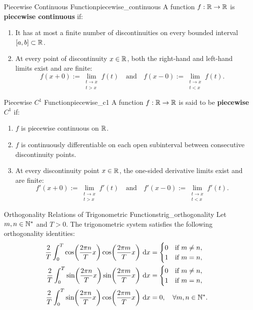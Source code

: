 \begin{definition}{Piecewise Continuous Function}{piecewise_continuous}
A function $f: \mathbb{R} \to \mathbb{R}$ is \textbf{piecewise continuous} if:
\begin{enumerate}
    \item It has at most a finite number of discontinuities on every bounded interval $[a, b] \subset \mathbb{R}$.
    \item At every point of discontinuity $x \in \mathbb{R}$, both the right-hand and left-hand limits exist and are finite:
    \[
    f(x+0) := \lim_{\substack{t \to x \\ t > x}} f(t) \quad \text{and} \quad f(x-0) := \lim_{\substack{t \to x \\ t < x}} f(t).
    \]
\end{enumerate}
\end{definition}

\begin{definition}{Piecewise $C^1$ Function}{piecewise_c1}
A function $f: \mathbb{R} \to \mathbb{R}$ is said to be \textbf{piecewise $C^1$} if:
\begin{enumerate}
    \item $f$ is piecewise continuous on $\mathbb{R}$.
    \item $f$ is continuously differentiable on each open subinterval between consecutive discontinuity points.
    \item At every discontinuity point $x \in \mathbb{R}$, the one-sided derivative limits exist and are finite:
    \[
    f'(x+0) := \lim_{\substack{t \to x \\ t > x}} f'(t) \quad \text{and} \quad f'(x-0) := \lim_{\substack{t \to x \\ t < x}} f'(t).
    \]
\end{enumerate}
\end{definition}

\begin{proposition}{Orthogonality Relations of Trigonometric Functions}{trig_orthogonality}
Let $m, n \in \mathbb{N}^*$ and $T > 0$. The trigonometric system satisfies the following orthogonality identities:
\begin{align}
\frac{2}{T} \int_0^T \cos\!\left(\frac{2\pi n}{T} x\right) \cos\!\left(\frac{2\pi m}{T} x\right) \,\mathrm{d}x &= \begin{cases} 0 & \text{if } m \neq n, \\ 1 & \text{if } m = n, \end{cases} \label{eq:ortho_cos} \\
\frac{2}{T} \int_0^T \sin\!\left(\frac{2\pi n}{T} x\right) \sin\!\left(\frac{2\pi m}{T} x\right) \,\mathrm{d}x &= \begin{cases} 0 & \text{if } m \neq n, \\ 1 & \text{if } m = n, \end{cases} \label{eq:ortho_sin} \\
\frac{2}{T} \int_0^T \sin\!\left(\frac{2\pi n}{T} x\right) \cos\!\left(\frac{2\pi m}{T} x\right) \,\mathrm{d}x &= 0, \quad \forall m, n \in \mathbb{N}^*. \label{eq:ortho_sincos}
\end{align}
\end{proposition}

